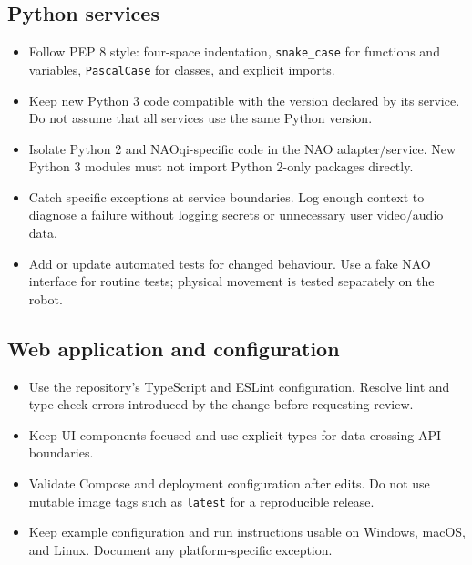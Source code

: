 \documentclass[12pt,a4paper]{article}
\begin{document}
\subsection{Python services}

\begin{itemize}

\item Follow PEP 8 style: four-space indentation, \texttt{snake\_case} for functions and variables, \texttt{PascalCase} for classes, and explicit imports.

\item Keep new Python 3 code compatible with the version declared by its service. Do not assume that all services use the same Python version.

\item Isolate Python 2 and NAOqi-specific code in the NAO adapter/service. New Python 3 modules must not import Python 2-only packages directly.

\item Catch specific exceptions at service boundaries. Log enough context to diagnose a failure without logging secrets or unnecessary user video/audio data.

\item Add or update automated tests for changed behaviour. Use a fake NAO interface for routine tests; physical movement is tested separately on the robot.

\end{itemize}

\subsection{Web application and configuration}

\begin{itemize}

\item Use the repository's TypeScript and ESLint configuration. Resolve lint and type-check errors introduced by the change before requesting review.

\item Keep UI components focused and use explicit types for data crossing API boundaries.

\item Validate Compose and deployment configuration after edits. Do not use mutable image tags such as \texttt{latest} for a reproducible release.

\item Keep example configuration and run instructions usable on Windows, macOS, and Linux. Document any platform-specific exception.

\end{itemize}
\end{document}
